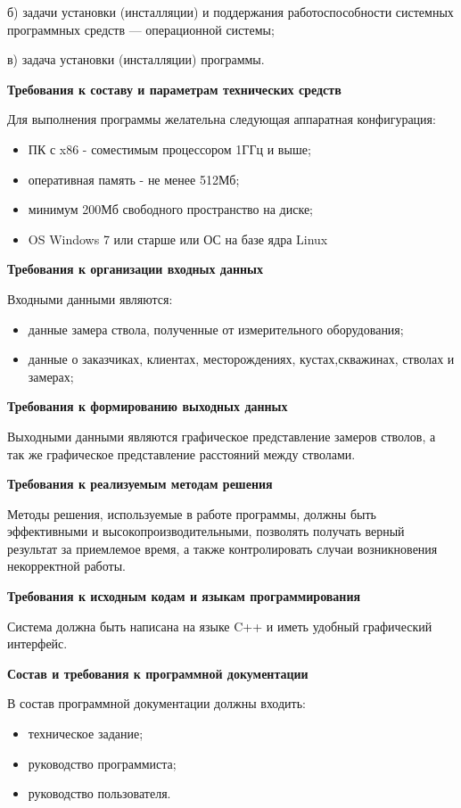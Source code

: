 б) задачи установки (инсталляции) и поддержания работоспособности системных программных средств — операционной системы;

в) задача установки (инсталляции) программы.

\textbf{Требования к составу и параметрам технических средств}

Для выполнения программы желательна следующая аппаратная конфигурация:

\begin{itemize}
  \item ПК с x86 - соместимым процессором 1ГГц и выше;
  \item оперативная память - не менее 512Мб;
  \item минимум 200Мб свободного пространство на диске;
  \item OS Windows 7 или старше или ОС на базе ядра Linux
\end{itemize}

\textbf{Требования к организации входных данных}

Входными данными являются:
\begin{itemize}
  \item данные замера ствола, полученные от измерительного оборудования;
  \item данные о заказчиках, клиентах, месторождениях, кустах,скважинах, стволах и замерах;
\end{itemize}

\textbf{Требования к формированию выходных данных}

Выходными данными являются графическое представление замеров стволов, а так же графическое представление расстояний
между стволами.

\textbf{Требования к реализуемым методам решения}

Методы решения, используемые в работе программы, должны быть эффективными и высокопроизводительными,
позволять получать верный результат за приемлемое время, а также контролировать случаи возникновения некорректной работы.

\textbf{Требования к исходным кодам и языкам программирования}

Система должна быть написана на языке C++ и иметь удобный графический интерфейс.

\textbf{Состав и требования к программной документации}

В состав программной документации должны входить:
\begin{itemize}
  \item техническое задание;
  \item руководство программиста;
  \item руководство пользователя.
\end{itemize}

